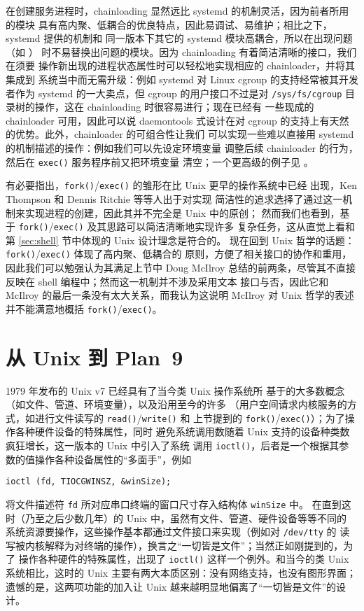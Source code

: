 在创建服务进程时，chainloading 显然远比 systemd 的机制灵活，因为前者所用的模块
具有高内聚、低耦合的优良特点，因此易调试、易维护；相比之下，systemd 提供的机制和
同一版本下其它的 systemd 模块高耦合，所以在出现问题（如 \parencite{edge2017}）
时不易替换出问题的模块。因为 chainloading 有着简洁清晰的接口，我们在须要
操作新出现的进程状态属性时可以轻松地实现相应的 chainloader，并将其集成到
系统当中而无需升级：例如 systemd 对 Linux cgroup 的支持经常被其开发者作为
systemd 的一大卖点，但 cgroup 的用户接口不过是对
\verb|/sys/fs/cgroup| 目录树的操作，这在 chainloading 时很容易进行；现在已经有
一些现成的 chainloader 可用，因此可以说 daemontools
式设计在对 cgroup 的支持上有天然的优势。此外，chainloader 的可组合性让我们
可以实现一些难以直接用 systemd 的机制描述的操作：例如我们可以先设定环境变量
调整后续 chainloader 的行为，然后在 \verb|exec()| 服务程序前又把环境变量
清空；一个更高级的例子见 \parencite{ska:syslogd}。

有必要指出，\verb|fork()|/\verb|exec()| 的雏形在比 Unix 更早的操作系统中已经
出现，Ken Thompson 和 Dennis Ritchie 等等人出于对实现
简洁性的追求选择了通过这一机制来实现进程的创建，因此其并不完全是 Unix 中的原创；
然而我们也看到，基于 \verb|fork()|/\verb|exec()| 及其思路可以简洁清晰地实现许多
复杂任务，这从直觉上看和第 \ref{sec:shell} 节中体现的 Unix 设计理念是符合的。
现在回到 Unix 哲学的话题：\verb|fork()|/\verb|exec()| 体现了高内聚、低耦合的
原则，方便了相关接口的协作和重用，因此我们可以勉强认为其满足上节中 Doug McIlroy
总结的前两条，尽管其不直接反映在 shell 编程中；然而这一机制并不涉及采用文本
接口与否，因此它和 McIlroy 的最后一条没有太大关系，而我认为这说明 McIlroy
对 Unix 哲学的表述并不能满意地概括 \verb|fork()|/\verb|exec()|。

\section{从 Unix 到 Plan~9}\label{sec:plan9}

1979 年发布的 Unix v7 已经具有了当今类 Unix 操作系统所
基于的大多数概念（如文件、管道、环境变量），以及沿用至今的许多%
（用户空间请求内核服务的方式，如进行文件读写的 \verb|read()|/\verb|write()| 和
上节提到的 \verb|fork()|/\verb|exec()|）；为了操作各种硬件设备的特殊属性，同时
避免系统调用数随着 Unix 支持的设备种类数疯狂增长，这一版本的 Unix 中引入了系统
调用 \verb|ioctl()|，后者是一个根据其参数的值操作各种设备属性的“多面手”，例如
\begin{quoting}
\begin{Verbatim}
ioctl (fd, TIOCGWINSZ, &winSize);
\end{Verbatim}
\end{quoting}
将文件描述符 \verb|fd| 所对应串口终端的窗口尺寸存入结构体 \verb|winSize| 中。
在直到这时（乃至之后少数几年）的 Unix 中，虽然有文件、管道、硬件设备等等不同的
系统资源要操作，这些操作基本都通过文件接口来实现（例如对 \verb|/dev/tty| 的
读写被内核解释为对终端的操作），换言之“一切皆是文件”；当然正如刚提到的，为了
操作各种硬件的特殊属性，出现了 \verb|ioctl()| 这样一个例外。和当今的类 Unix
系统相比，这时的 Unix 主要有两大本质区别：没有网络支持，也没有图形界面；
遗憾的是，这两项功能的加入让 Unix 越来越明显地偏离了“一切皆是文件”的设计。

